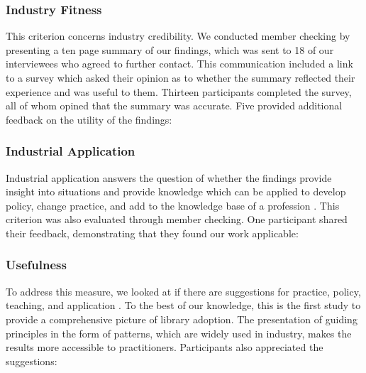 \subsubsection{Industry Fitness}
This criterion concerns industry credibility. We conducted member checking \cite{creswell2016qualitative} by presenting a ten page summary of our findings, which was sent to 18 of our interviewees who agreed to further contact. This communication included a link to a survey which asked their opinion as to whether the summary reflected their experience and was useful to them. Thirteen participants completed the survey, all of whom opined that the summary was accurate. Five provided additional feedback on the utility of the findings:

\subsubsection{Industrial Application} Industrial application answers the question of whether the findings provide insight into situations and provide knowledge which can be applied to develop policy, change practice, and add to the knowledge base of a profession \cite{corbin2014gt}. This criterion was also evaluated through member checking. One participant shared their feedback, demonstrating that they found our work applicable: 

\subsubsection{Usefulness} To address this measure, we looked at if there are suggestions for practice, policy, teaching, and application \cite{corbin2014gt}. To the best of our knowledge, this is the first study to provide a comprehensive picture of library adoption. The presentation of guiding principles in the form of patterns, which are widely used in industry, makes the results more accessible to practitioners. Participants also appreciated the suggestions:

